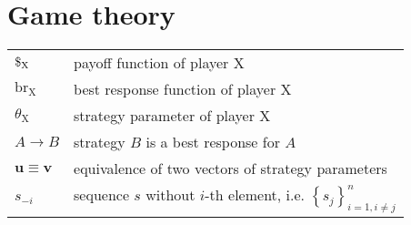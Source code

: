 \documentclass[../main.tex]{subfiles}
\begin{document}
\section*{Game theory}
\hspace*{-0.275cm}
\begin{tabular}{p{2.2cm}l}
    $\$_\text{X}$ & payoff function of player X \\
    $\text{br}_\text{X}$ & best response function of player X \\
    $\theta_\text{X}$ & strategy parameter of player X \\
    $A \to B$ & strategy $B$ is a best response for $A$ \\
    $\mathbf{u} \equiv \mathbf{v}$ & equivalence of two vectors of strategy parameters \\
    $s_{-i}$ & sequence $s$ without $i$-th element, i.e. $\left\{s_j\right\}_{i=1, i \neq j}^n$ \\
\end{tabular}
\end{document}
